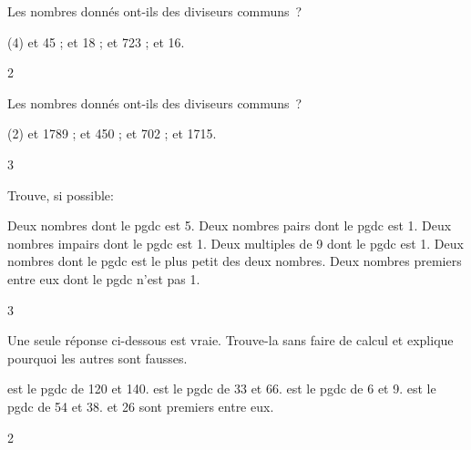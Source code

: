 \documentclass[a4paper,12pt]{report}
\begin{document}
\begin{exo}{
    Les nombres donnés ont-ils des diviseurs communs~?
    \begin{tasks}(4)
         et 45 ;
         et 18 ;
         et 723 ;
         et 16.
    \end{tasks}
}{2}\end{exo}



\begin{exo}{
    Les nombres donnés ont-ils des diviseurs communs~?
    \begin{tasks}(2)
         et 1789 ;
         et 450 ;
         et 702 ;
         et 1715.
    \end{tasks}
}{3}\end{exo}




\begin{exo}{
    Trouve, si possible:

    \begin{tasks}
    \task Deux nombres dont le pgdc est 5.
    \task Deux nombres pairs dont le pgdc est 1.
    \task Deux nombres impairs dont le pgdc est 1.
    \task Deux multiples de 9 dont le pgdc est 1.
    \task Deux nombres dont le pgdc est le plus petit des deux nombres.
    \task Deux nombres premiers entre eux dont le pgdc n'est pas 1.
    \end{tasks}
}{3}\end{exo}






\begin{exo}{
    Une seule réponse ci-dessous est vraie. Trouve-la sans faire de calcul et explique pourquoi les autres sont fausses.
    
    \begin{tasks}
         est le pgdc de 120 et 140.
         est le pgdc de 33 et 66.
         est le pgdc de 6 et 9.
         est le pgdc de 54 et 38.
         et 26 sont premiers entre eux.
    \end{tasks}

}{2}\end{exo}
\end{document}
